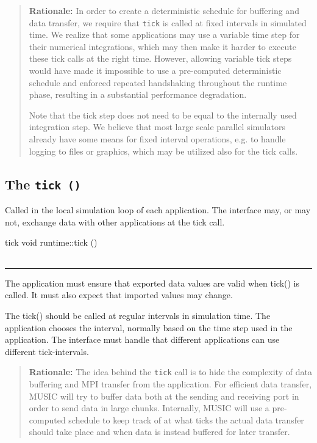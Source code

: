 \documentclass[a4paper]{report}
\makeatletter
\newenvironment{rationale}%
{\par\begin{quote}\textbf{Rationale:}}%
{\par\end{quote}}
\newenvironment{parameters}%
{\begin{tabular}{@{\hspace{2em}}lp{0.6\textwidth}}}%
{\end{tabular}\par\vspace{1mm}\par\hrule\par\vspace{5mm}}
\makeatother
\begin{document}
\begin{rationale}
  In order to create a deterministic schedule for buffering and data
  transfer, we require that \lstinline|tick| is called at fixed
  intervals in simulated time.  We realize that some applications may
  use a variable time step for their
  numerical integrations, which may then make it harder to execute
  these tick calls at the right time.  However, allowing variable tick
  steps would have made it impossible to use a pre-computed
  deterministic schedule and enforced repeated handshaking throughout
  the runtime phase, resulting in a substantial performance
  degradation.

  Note that the tick step does not need to be equal to the internally
  used integration step.  We believe that most
  large scale parallel simulators already have some means for fixed
  interval operations, e.g. to handle logging to files or graphics,
  which may be utilized also for the tick calls.
\end{rationale}


\subsection{The \lstinline|tick ()|}

Called in the local simulation loop of each application.  The
interface may, or may not, exchange data with other applications at
the tick call.

\begin{head}{tick}
  void runtime::tick ()
\end{head}
\begin{parameters}
\end{parameters}

The application must ensure that exported data values are valid when
tick() is called.  It must also expect that imported values may change.

The tick() should be called at regular intervals in simulation time.
The application chooses the interval, normally based on the time step
used in the application.  The interface must handle that different
applications can use different tick-intervals.

\begin{rationale}
  The idea behind the \lstinline|tick| call is to hide the complexity
  of data buffering and MPI transfer from the application.  For
  efficient data transfer, MUSIC will try to buffer data both at the
  sending and receiving port in order to send data in large chunks.
  Internally, MUSIC will use a pre-computed schedule to keep track of
  at what ticks the actual data transfer should take place and when
  data is instead buffered for later transfer.
\end{rationale}
\end{document}
